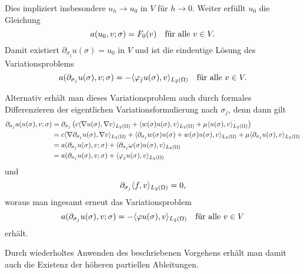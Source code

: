 \begin{Satz}
\begin{Beweis}
        Dies impliziert insbesondere $u_{h} \to u_{0}$ in $V$ für $h \to 0$.
        Weiter erfüllt $u_{0}$ die Gleichung
        \begin{equation}
            a(u_{0}, v; \sigma) = F_{0}(v) \quad \fa v \in V.
        \end{equation}
        Damit existiert $\partial_{\sigma_{j}} u(\sigma) = u_{0}$ in $V$ und ist die eindeutige Lösung des Variationsproblems
        \begin{equation}
            a(\partial_{\sigma_{j}} u(\sigma), v; \sigma) = - \skp{\varphi_{j} u(\sigma)}{v}{L_{2}(\Omega)} \quad \fa v \in V.
        \end{equation}

        Alternativ erhält man dieses Variationsproblem auch durch formales Differenzieren der eigentlichen Variationsformulierung nach $\sigma_{j}$, denn dann gilt
        \begin{align}
            \partial_{\sigma_{j}} a(u(\sigma), v; \sigma)
            &= \partial_{\sigma_{j}} \left( c \skp{\grad u(\sigma)}{\grad v}{L_{2}(\Omega)} + \skp{w(\sigma)u(\sigma)}{v}{L_{2}(\Omega)} + \mu \skp{u(\sigma)}{v}{L_{2}(\Omega)} \right)
            \\&= c \skp{\grad \partial_{\sigma_{j}} u(\sigma)}{\grad v}{L_{2}(\Omega)} + \skp{ \partial_{\sigma_{j}} w(\sigma)u(\sigma) + w(\sigma) u(\sigma) }{v}{L_{2}(\Omega)} + \mu \skp{\partial_{\sigma_{j}}u(\sigma)}{v}{L_{2}(\Omega)}
            \\&= a(\partial_{\sigma_{j}} u(\sigma), v; \sigma) + \skp{\partial_{\sigma_{j}}\omega(\sigma)u(\sigma)}{v}{L_{2}(\Omega)}
            \\&= a(\partial_{\sigma_{j}} u(\sigma), v; \sigma) + \skp{\varphi_{j} u(\sigma)}{v}{L_{2}(\Omega)}
        \end{align}
        und
        \begin{equation}
            \partial_{\sigma_{j}} \skp{f}{v}{L_{2}(\Omega)} = 0,
        \end{equation}
        woraus man ingesamt erneut das Variationsproblem
        \begin{equation}
            a(\partial_{\sigma_{j}} u(\sigma), v; \sigma) = - \skp{\varphi u(\sigma)}{v}{L_{2}(\Omega)} \quad \fa v \in V
        \end{equation}
        erhält.

        Durch wiederholtes Anwenden des beschriebenen Vorgehens erhält man damit auch die Existenz der höheren partiellen Ableitungen.
    \end{Beweis}
\end{Satz}

